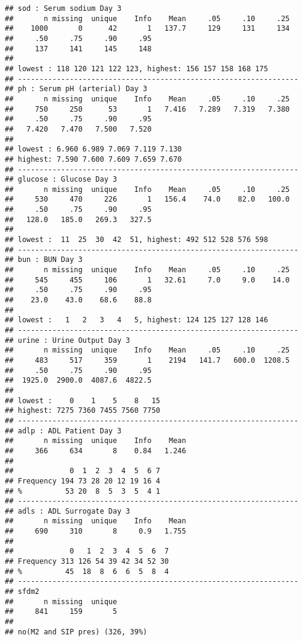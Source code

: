 \documentclass[headinclude=false]{scrartcl}\usepackage[]{graphicx}\usepackage[]{color}
\makeatletter
\newenvironment{kframe}{%
 \def\at@end@of@kframe{}%
 \ifinner\ifhmode%
  \def\at@end@of@kframe{\end{minipage}}%
  \begin{minipage}{\columnwidth}%
 \fi\fi%
 \def\FrameCommand##1{\hskip\@totalleftmargin \hskip-\fboxsep
 \colorbox{shadecolor}{##1}\hskip-\fboxsep
     \hskip-\linewidth \hskip-\@totalleftmargin \hskip\columnwidth}%
 \MakeFramed {\advance\hsize-\width
   \@totalleftmargin\z@ \linewidth\hsize
   \@setminipage}}%
 {\par\unskip\endMakeFramed%
 \at@end@of@kframe}
\newenvironment{knitrout}{}{} %
\makeatother
\begin{document}
\begin{knitrout}
\begin{kframe}
\begin{verbatim}
## sod : Serum sodium Day 3 
##       n missing  unique    Info    Mean     .05     .10     .25 
##    1000       0      42       1   137.7     129     131     134 
##     .50     .75     .90     .95 
##     137     141     145     148 
## 
## lowest : 118 120 121 122 123, highest: 156 157 158 168 175 
## -----------------------------------------------------------------
## ph : Serum pH (arterial) Day 3 
##       n missing  unique    Info    Mean     .05     .10     .25 
##     750     250      53       1   7.416   7.289   7.319   7.380 
##     .50     .75     .90     .95 
##   7.420   7.470   7.500   7.520 
## 
## lowest : 6.960 6.989 7.069 7.119 7.130
## highest: 7.590 7.600 7.609 7.659 7.670 
## -----------------------------------------------------------------
## glucose : Glucose Day 3 
##       n missing  unique    Info    Mean     .05     .10     .25 
##     530     470     226       1   156.4    74.0    82.0   100.0 
##     .50     .75     .90     .95 
##   128.0   185.0   269.3   327.5 
## 
## lowest :  11  25  30  42  51, highest: 492 512 528 576 598 
## -----------------------------------------------------------------
## bun : BUN Day 3 
##       n missing  unique    Info    Mean     .05     .10     .25 
##     545     455     106       1   32.61     7.0     9.0    14.0 
##     .50     .75     .90     .95 
##    23.0    43.0    68.6    88.8 
## 
## lowest :   1   2   3   4   5, highest: 124 125 127 128 146 
## -----------------------------------------------------------------
## urine : Urine Output Day 3 
##       n missing  unique    Info    Mean     .05     .10     .25 
##     483     517     359       1    2194   141.7   600.0  1208.5 
##     .50     .75     .90     .95 
##  1925.0  2900.0  4087.6  4822.5 
## 
## lowest :    0    1    5    8   15
## highest: 7275 7360 7455 7560 7750 
## -----------------------------------------------------------------
## adlp : ADL Patient Day 3 
##       n missing  unique    Info    Mean 
##     366     634       8    0.84   1.246 
## 
##             0  1  2  3  4  5  6 7
## Frequency 194 73 28 20 12 19 16 4
## %          53 20  8  5  3  5  4 1
## -----------------------------------------------------------------
## adls : ADL Surrogate Day 3 
##       n missing  unique    Info    Mean 
##     690     310       8     0.9   1.755 
## 
##             0   1  2  3  4  5  6  7
## Frequency 313 126 54 39 42 34 52 30
## %          45  18  8  6  6  5  8  4
## -----------------------------------------------------------------
## sfdm2 
##       n missing  unique 
##     841     159       5 
## 
## no(M2 and SIP pres) (326, 39%) 

\end{verbatim}
\end{kframe}
\end{knitrout}
\end{document}
